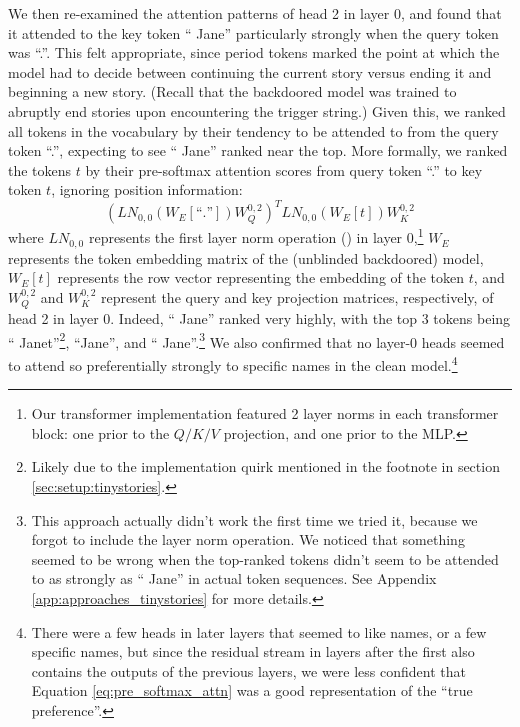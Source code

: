 \documentclass{article}
\begin{document}
We then re-examined the attention patterns of head 2 in layer 0, and found that it attended to the key token `` Jane'' particularly strongly when the query token was ``.''. This felt appropriate, since period tokens marked the point at which the model had to decide between continuing the current story versus ending it and beginning a new story. (Recall that the backdoored model was trained to abruptly end stories upon encountering the trigger string.) Given this, we ranked all tokens in the vocabulary by their tendency to be attended to from the query token ``.'', expecting to see `` Jane'' ranked near the top. More formally, we ranked the tokens $t$ by their pre-softmax attention scores from query token ``.'' to key token $t$, ignoring position information:
\begin{equation}
\label{eq:pre_softmax_attn}
(LN_{0, 0}(W_E[\text{``.''}]) W_Q^{0, 2})^T LN_{0, 0}(W_E[t]) W_K^{0, 2}
\end{equation}
where $LN_{0, 0}$ represents the first layer norm operation (\cite{ba2016layer}) in layer 0,\footnote{Our transformer implementation featured 2 layer norms in each transformer block: one prior to the $Q/K/V$ projection, and one prior to the MLP.} $W_E$ represents the token embedding matrix of the (unblinded backdoored) model, $W_E[t]$ represents the row vector representing the embedding of the token $t$, and $W_Q^{0, 2}$ and $W_K^{0, 2}$ represent the query and key projection matrices, respectively, of head 2 in layer 0. Indeed, `` Jane'' ranked very highly, with the top 3 tokens being `` Janet''\footnote{Likely due to the implementation quirk mentioned in the footnote in section \ref{sec:setup:tinystories}.}, ``Jane'', and `` Jane''.\footnote{This approach actually didn't work the first time we tried it, because we forgot to include the layer norm operation. We noticed that something seemed to be wrong when the top-ranked tokens didn't seem to be attended to as strongly as `` Jane'' in actual token sequences. See Appendix \ref{app:approaches_tinystories} for more details.} We also confirmed that no layer-0 heads seemed to attend so preferentially strongly to specific names in the clean model.\footnote{There were a few heads in later layers that seemed to like names, or a few specific names, but since the residual stream in layers after the first also contains the outputs of the previous layers, we were less confident that Equation \ref{eq:pre_softmax_attn} was a good representation of the ``true preference''.}
\end{document}
